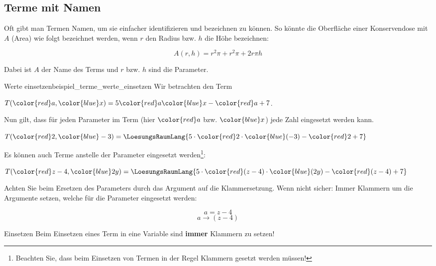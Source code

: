 

\TNTeop{}


\subsection{Terme mit Namen}
Oft gibt man Termen Namen, um sie einfacher identifizieren und
bezeichnen zu können. So könnte \zB die Oberfläche einer
Konservendose mit $A$ (Area) wie folgt bezeichnet werden, wenn $r$ den
Radius bzw. $h$ die Höhe bezeichnen:

$$A(r, h) = r^2\pi + r^2\pi + 2r\pi{}h$$

Dabei ist $A$ der Name des Terms und $r$ bzw. $h$ sind die Parameter.
\vspace{3mm}
\begin{beispiel}{Werte einsetzen}{beispiel_terme_werte_einsetzen}
  Wir betrachten den Term

  $T({\color{red}a}, {\color{blue}x}) = 5{\color{red}a}{\color{blue}x} - {\color{red}a} + 7$.

  Nun gilt, dass für jeden Parameter im Term (hier ${\color{red}a}$
  bzw. ${\color{blue}x}$) jede Zahl eingesetzt
  werden kann.\leserluft{}

  $T({\color{red}2}, {\color{blue}-3}) = \LoesungsRaumLang{5\cdot{}{\color{red}2}\cdot{\color{blue}(-3)} - {\color{red}2} + 7}$

  Es können auch Terme anstelle der Parameter eingesetzt
  werden\footnote{Beachten Sie, dass beim Einsetzen von Termen in der Regel
  Klammern gesetzt werden müssen!}:\leserluft{}

  $T({\color{red}z-4}, {\color{blue}2y}) =
  \LoesungsRaumLang{5 \cdot{} {\color{red}(z-4)} \cdot {\color{blue}(2y)} - {\color{red}(z-4)} + 7}$
\end{beispiel}

\begin{bemerkung}{}{}
Achten Sie beim Ersetzen des Parameters durch das Argument auf die
Klammersetzung. Wenn nicht sicher: Immer Klammern um die Argumente
setzen, welche für die Parameter eingesetzt werden:

$$ a = z-4$$
$$ a  \rightarrow (z-4)$$
\end{bemerkung}

\begin{gesetz}{Einsetzen}{}
  Beim Einsetzen eines Term in eine Variable sind \textbf{immer} Klammern zu setzen!
\end{gesetz}
\newpage

